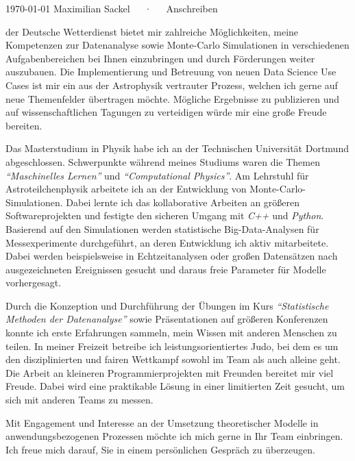 \documentclass[11pt, a4paper]{Awesome-CV/awesome-cv}
\begin{document}
\makecvheader[R]

\makecvfooter
{\today}
{Maximilian Sackel~~~·~~~Anschreiben}
{}

\makelettertitle

\begin{cvletter}
    der Deutsche Wetterdienst bietet mir
    zahlreiche Möglichkeiten, meine Kompetenzen zur Datenanalyse sowie Monte-Carlo Simulationen in
    verschiedenen Aufgabenbereichen bei Ihnen einzubringen und durch Förderungen weiter auszubauen.
    Die Implementierung und Betreuung von neuen Data Science Use Cases ist mir
    ein aus der Astrophysik vertrauter Prozess,
    welchen ich gerne auf neue Themenfelder übertragen möchte.
    Mögliche Ergebnisse zu publizieren und auf wissenschaftlichen Tagungen zu
    verteidigen würde mir eine große Freude bereiten.

    Das Masterstudium in Physik habe ich an der Technischen Universität Dortmund
    abgeschlossen.
    Schwerpunkte während meines Studiums waren die Themen \textit{``Maschinelles Lernen''} und \textit{``Computational Physics''}.
    Am Lehrstuhl für Astroteilchenphysik arbeitete ich an der Entwicklung von Monte-Carlo-Simulationen.
    Dabei lernte ich das kollaborative Arbeiten an größeren Softwareprojekten und festigte den sicheren Umgang mit \textit{C++} und \textit{Python}.
    Basierend auf den Simulationen werden statistische Big-Data-Analysen für
    Messexperimente durchgeführt, an deren Entwicklung ich aktiv mitarbeitete.
    Dabei werden beispielsweise in Echtzeitanalysen oder großen Datensätzen
    nach ausgezeichneten Ereignissen gesucht und daraus freie Parameter für Modelle vorhergesagt.

    Durch die Konzeption und Durchführung der Übungen im Kurs
    \textit{``Statistische Methoden der Datenanalyse''} sowie Präsentationen
    auf größeren Konferenzen konnte ich erste Erfahrungen sammeln, mein Wissen mit anderen Menschen
zu teilen. In meiner Freizeit betreibe ich leistungsorientiertes Judo, bei dem es um den disziplinierten und fairen Wettkampf sowohl im Team als auch alleine geht. Die Arbeit an kleineren Programmierprojekten mit Freunden bereitet mir
viel Freude. Dabei wird eine praktikable Lösung in einer limitierten Zeit gesucht, um sich mit anderen Teams zu messen.

    Mit Engagement und Interesse an der Umsetzung theoretischer Modelle in anwendungsbezogenen Prozessen möchte ich mich gerne in Ihr Team einbringen.
    Ich freue mich darauf, Sie in einem persönlichen Gespräch zu überzeugen.

\end{cvletter}


\makeletterclosing
\end{document}
